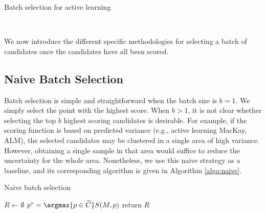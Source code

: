 {\fontsize{10}{10}\selectfont
\begin{algorithm}
\scriptsize
\caption{Batch selection for active learning}
\label{algo:al}
\begin{algorithmic}
\\
\EndWhile
\end{algorithmic}
\end{algorithm}
}

We now introduce the different specific methodologies for selecting a batch of candidates once the candidates have all been scored.

\subsection{Naive Batch Selection}
Batch selection is simple and straightforward when the batch size is $b = 1$.
%
We simply select the point with the highest score.
%
When $b>1$, it is not clear whether selecting the top $b$ highest scoring candidates is desirable.
%
For example, if the scoring function is based on predicted variance (e.g., active learning MacKay, ALM), the selected candidates may be clustered in a single area of high variance.
%
However, obtaining a single sample in that area would suffice to reduce the uncertainty for the whole area.
%
Nonetheless, we use this naive strategy as a baseline, and its corresponding algorithm is given in Algorithm \ref{algo:naive}.

{\fontsize{10}{10}\selectfont
\begin{algorithm}
\scriptsize
\caption{Naive batch selection}
\label{algo:naive}
\begin{algorithmic}
  \State $R \gets \emptyset$
  \State $p^* = \argmax{p \in \widetilde{C}} S(M, p)$
  \EndWhile
  \State return $R$
\EndProcedure
\end{algorithmic}
\end{algorithm}
}

